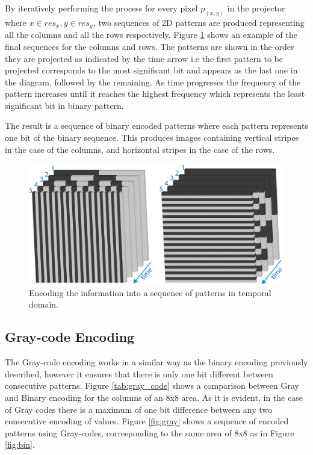 \documentclass[final,12pt,3p]{elsarticle}
\begin{document}
By iteratively performing the process for every pixel $p_{(x,y)}$ in the projector where $x \in res_{x}, y \in res_{y}$, two sequences of 2D patterns are produced representing all the columns and all the rows respectively. Figure \ref{fig:pattern_encoding} shows an example of the final sequences for the columns and rows. The patterns are shown in the order they are projected as indicated by the time arrow i.e the first pattern to be projected corresponds to the most significant bit and appears as the last one in the diagram, followed by the remaining. As time progresses the frequency of the pattern increases until it reaches the highest frequency which represents the least significant bit in binary pattern.

The result is a sequence of binary encoded patterns where each pattern represents one bit of the binary sequence. This produces images containing vertical stripes in the case of the columns, and horizontal stripes in the case of the rows. 

\begin{figure}[!ht]
 \centering
 \includegraphics[scale=0.5]{./images/32x32binSeq.png}
 \caption{\label{fig:pattern_encoding} Encoding the information into a sequence of patterns in temporal domain.}
\end{figure}

\subsection{Gray-code Encoding}
The Gray-code encoding works in a similar way as the binary encoding previously described, however it ensures that there is only one bit different between consecutive patterns. Figure \ref{tab:gray_code} shows a comparison between Gray and Binary encoding for the columns of an 8x8 area. As it is evident, in the case of Gray codes there is a maximum of one bit difference between any two consecutive encoding of values. Figure \ref{fig:gray} shows a sequence of encoded patterns using Gray-codes, corresponding to the same area of 8x8 as in Figure \ref{fig:bin}.
\end{document}
